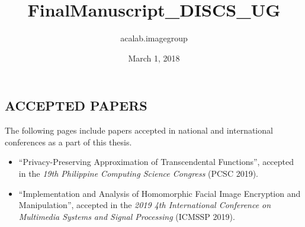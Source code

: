 \documentclass[oneside,12pt]{discsthesis}
\title{FinalManuscript_DISCS_UG}
\author{acalab.imagegroup }
\date{March 1, 2018}
\begin{document}





\FrontMatter


\tableofcontents
\listoffigures
\listoftables





%
%

%

%
%
%



\addappheadtotoc
\begin{appendices}
% 

\chapter{ACCEPTED PAPERS}
The following pages include papers accepted in national and international conferences as a part of this thesis.
\begin{itemize}
    \item ``Privacy-Preserving Approximation of Transcendental Functions'', accepted in the \textit{19th Philippine Computing Science Congress} (PCSC 2019).
    \item ``Implementation and Analysis of Homomorphic Facial
    Image Encryption and Manipulation'', accepted in the \textit{2019 4th International Conference on Multimedia Systems and Signal Processing} (ICMSSP 2019).
\end{itemize}
\end{appendices}
\end{document}
